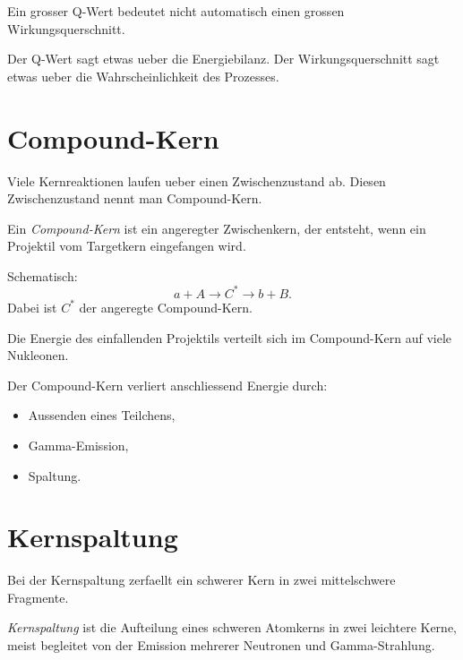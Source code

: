 \begin{examtipbox}
Ein grosser Q-Wert bedeutet nicht automatisch einen grossen Wirkungsquerschnitt.

Der Q-Wert sagt etwas ueber die Energiebilanz.
Der Wirkungsquerschnitt sagt etwas ueber die Wahrscheinlichkeit des Prozesses.
\end{examtipbox}

\section{Compound-Kern}

Viele Kernreaktionen laufen ueber einen Zwischenzustand ab.
Diesen Zwischenzustand nennt man Compound-Kern.

\begin{definitionbox}
Ein \emph{Compound-Kern} ist ein angeregter Zwischenkern, der entsteht, wenn ein
Projektil vom Targetkern eingefangen wird.
\end{definitionbox}

\begin{formulabox}
Schematisch:
\[
    a + A \rightarrow C^* \rightarrow b + B.
\]
Dabei ist $C^*$ der angeregte Compound-Kern.
\end{formulabox}

\begin{conceptbox}
Die Energie des einfallenden Projektils verteilt sich im Compound-Kern auf viele
Nukleonen.

Der Compound-Kern verliert anschliessend Energie durch:
\begin{itemize}
    \item Aussenden eines Teilchens,
    \item Gamma-Emission,
    \item Spaltung.
\end{itemize}
\end{conceptbox}

\section{Kernspaltung}

Bei der Kernspaltung zerfaellt ein schwerer Kern in zwei mittelschwere Fragmente.

\begin{definitionbox}
\emph{Kernspaltung} ist die Aufteilung eines schweren Atomkerns in zwei leichtere
Kerne, meist begleitet von der Emission mehrerer Neutronen und Gamma-Strahlung.
\end{definitionbox}

